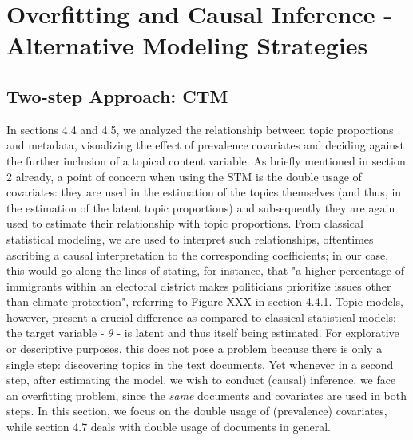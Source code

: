 \documentclass[12pt]{article}
\begin{document}
\section{Overfitting and Causal Inference - Alternative Modeling Strategies}

\subsection{Two-step Approach: CTM}

In sections 4.4 and 4.5, we analyzed the relationship between topic proportions and metadata, visualizing the effect of prevalence covariates and deciding against the further inclusion of a topical content variable. As briefly mentioned in section 2 already, a point of concern when using the STM is the double usage of covariates: they are used in the estimation of the topics themselves (and thus, in the estimation of the latent topic proportions) and subsequently they are again used to estimate their relationship with topic proportions. From classical statistical modeling, we are used to interpret such relationships, oftentimes ascribing a causal interpretation to the corresponding coefficients; in our case, this would go along the lines of stating, for instance, that "a higher percentage of immigrants within an electoral district makes politicians prioritize issues other than climate protection", referring to Figure XXX in section 4.4.1. Topic models, however, present a crucial difference as compared to classical statistical models: the target variable - $\theta$ - is latent and thus itself being estimated. For explorative or descriptive purposes, this does not pose a problem because there is only a single step: discovering topics in the text documents. Yet whenever in a second step, after estimating the model, we wish to conduct (causal) inference, we face an overfitting problem, since the \textit{same} documents and covariates are used in both steps. In this section, we focus on the double usage of (prevalence) covariates, while section 4.7 deals with double usage of documents in general.
\end{document}
